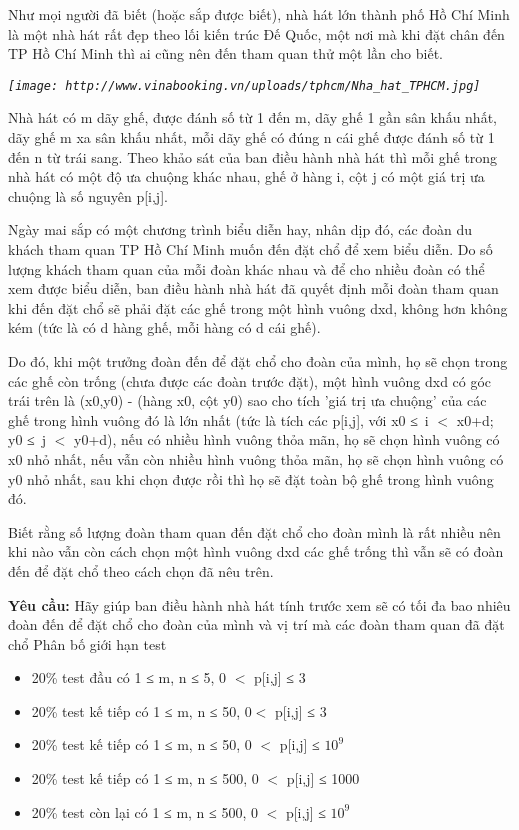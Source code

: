Như mọi người đã biết (hoặc sắp được biết), nhà hát lớn thành phố Hồ Chí Minh là một nhà hát rất đẹp theo lối kiến trúc Đế Quốc, một nơi mà khi đặt chân đến TP Hồ Chí Minh thì ai cũng nên đến tham quan thử một lần cho biết.

\emph{
\texttt{[image: http://www.vinabooking.vn/uploads/tphcm/Nha\_hat\_TPHCM.jpg]}}

   Nhà hát có m dãy ghế, được đánh số từ 1 đến m, dãy ghế 1 gần sân khấu nhất, dãy ghế m xa sân khấu nhất, mỗi dãy ghế có đúng n cái ghế được đánh số từ 1 đến n từ trái sang. Theo khảo sát của ban điều hành nhà hát thì mỗi ghế trong nhà hát có một độ ưa chuộng khác nhau, ghế ở hàng i, cột j có một giá trị ưa chuộng là số nguyên p[i,j].  

   Ngày mai sắp có một chương trình biểu diễn hay, nhân dịp đó, các đoàn du khách tham quan TP Hồ Chí Minh muốn đến đặt chổ để xem biểu diễn. Do số lượng khách tham quan của mỗi đoàn khác nhau và để cho nhiều đoàn có thể xem được biểu diễn, ban điều hành nhà hát đã quyết định mỗi đoàn tham quan khi đến đặt chổ sẽ phải đặt các ghế trong một hình vuông dxd, không hơn không kém (tức là có d hàng ghế, mỗi hàng có d cái ghế).  

   Do đó, khi một trưởng đoàn đến để đặt chổ cho đoàn của mình, họ sẽ chọn trong các ghế còn trống (chưa được các đoàn trước đặt), một hình vuông dxd có góc trái trên là (x0,y0) - (hàng x0, cột y0) sao cho tích 'giá trị ưa chuộng' của các ghế trong hình vuông đó là lớn nhất (tức là tích các p[i,j], với x0 ≤ i $<$ x0+d; y0 ≤ j $<$ y0+d), nếu có nhiều hình vuông thỏa mãn, họ sẽ chọn hình vuông có x0 nhỏ nhất, nếu vẫn còn nhiều hình vuông thỏa mãn, họ sẽ chọn hình vuông có y0 nhỏ nhất, sau khi chọn được rồi thì họ sẽ đặt toàn bộ ghế trong hình vuông đó.  

   Biết rằng số lượng đoàn tham quan đến đặt chổ cho đoàn mình là rất nhiều nên khi nào vẫn còn cách chọn một hình vuông dxd các ghế trống thì vẫn sẽ có đoàn đến để đặt chổ theo cách chọn đã nêu trên.  

\textbf{    Yêu cầu:   }   Hãy giúp ban điều hành nhà hát tính trước xem sẽ có tối đa bao nhiêu đoàn đến để đặt chổ cho đoàn của mình và vị trí mà các đoàn tham quan đã đặt chổ
Phân bố giới hạn test
\begin{itemize}
	\item     20\% test đầu có 1 ≤ m, n ≤ 5, 0 $<$ p[i,j] ≤ 3   
	\item     20\% test kế tiếp có 1 ≤ m, n ≤ 50, 0$<$ p[i,j] ≤ 3   
	\item     20\% test kế tiếp có 1 ≤ m, n ≤ 50, 0 $<$ p[i,j] ≤ $10^{9}$
	\item     20\% test kế tiếp có 1 ≤ m, n ≤ 500, 0 $<$ p[i,j] ≤ 1000   
	\item     20\% test còn lại có 1 ≤ m, n ≤ 500, 0 $<$ p[i,j] ≤ $10^{9}$
\end{itemize}